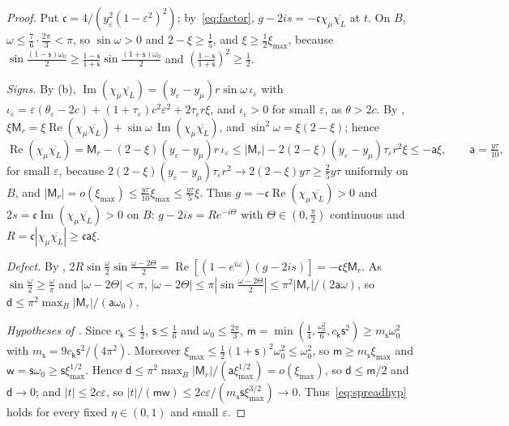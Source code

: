 \documentclass[11pt]{article}
\theoremstyle{definition}
\theoremstyle{remark}
\newcommand{\Rea}{\operatorname{Re}}
\newcommand{\Ima}{\operatorname{Im}}
\begin{document}
\begin{proof}
Put \(\mathfrak c=4/(y_\varepsilon^2(1-\varepsilon^2)^2)\); by~\eqref{eq:factor}, \(g-2is=-\mathfrak c\chi_\mu\overline{\chi_L}\) at \(t\).  On \(B\), \(\omega\le\frac76\cdot\frac{2\pi}3<\pi\), so
\(\sin\omega>0\) and \(2-\xi\ge\frac15\), and \(\xi\ge\frac12\xi_{\max}\), because \(\sin\frac{(1-\mathsf s)\omega_0}2\ge\frac{1-\mathsf s}{1+\mathsf s}\sin\frac{(1+\mathsf s)\omega_0}2\) and
\((\frac{1-\mathsf s}{1+\mathsf s})^2\ge\frac12\).

\emph{Signs.}  By (b), \(\Ima(\chi_\mu\overline{\chi_L})=(y_\varepsilon-y_\mu)r\sin\omega\,\iota_\varepsilon\) with
\(\iota_\varepsilon=\varepsilon(\theta_\varepsilon-2c)+(1+\tau_\varepsilon)c^2\varepsilon^2+2\tau_\varepsilon r\xi\), and \(\iota_\varepsilon>0\) for small \(\varepsilon\), as \(\theta>2c\).  By ,
\(\xi\mathsf M_r=\xi\Rea(\chi_\mu\overline{\chi_L})+\sin\omega\,\Ima(\chi_\mu\overline{\chi_L})\), and \(\sin^2\omega=\xi(2-\xi)\); hence
\[
\Rea(\chi_\mu\overline{\chi_L})=\mathsf M_r-(2-\xi)(y_\varepsilon-y_\mu)r\,\iota_\varepsilon\le|\mathsf M_r|-2(2-\xi)(y_\varepsilon-y_\mu)\tau_\varepsilon r^2\xi\le-\mathsf a\xi,\qquad \mathsf a=\tfrac{y\tau}{10},
\]
for small \(\varepsilon\), because \(2(2-\xi)(y_\varepsilon-y_\mu)\tau_\varepsilon r^2\to2(2-\xi)y\tau\ge\frac25y\tau\) uniformly on \(B\), and \(|\mathsf M_r|=o(\xi_{\max})\le\frac{y\tau}{10}\xi_{\max}\le\frac{y\tau}5\xi\).
Thus \(g=-\mathfrak c\Rea(\chi_\mu\overline{\chi_L})>0\) and \(2s=\mathfrak c\Ima(\chi_\mu\overline{\chi_L})>0\) on \(B\): \(g-2is=Re^{-i\Theta}\) with \(\Theta\in(0,\frac\pi2)\)
continuous and \(R=\mathfrak c|\chi_\mu\overline{\chi_L}|\ge\mathfrak c \mathsf a\xi\).

\emph{Defect.}  By , \(2R\sin\frac\omega2\sin\frac{\omega-2\Theta}2=\Rea[(1-e^{i\omega})(g-2is)]=-\mathfrak c\xi\mathsf M_r\).  As
\(\sin\frac\omega2\ge\frac\omega\pi\) and \(|\omega-2\Theta|<\pi\),
\(|\omega-2\Theta|\le\pi|\sin\frac{\omega-2\Theta}2|\le\pi^2|\mathsf M_r|/(2\mathsf a\omega)\), so \(\mathsf d\le\pi^2\max_B|\mathsf M_r|/(\mathsf a\omega_0)\).

\emph{Hypotheses of .}  Since \(c_{\mathsf k}\le\frac12\), \(\mathsf s\le\frac16\) and \(\omega_0\le\frac{2\pi}3\),
\(\mathsf m=\min(\frac14,\frac{\omega_0^2}6,c_{\mathsf k}\mathsf s^2)\ge m_{\mathsf s}\omega_0^2\) with \(m_{\mathsf s}=9c_{\mathsf k}\mathsf s^2/(4\pi^2)\).  Moreover
\(\xi_{\max}\le\frac12(1+\mathsf s)^2\omega_0^2\le\omega_0^2\), so \(\mathsf m\ge m_{\mathsf s}\xi_{\max}\) and \(\mathsf w=\mathsf s\omega_0\ge\mathsf s\xi_{\max}^{1/2}\).  Hence
\(\mathsf d\le\pi^2\max_B|\mathsf M_r|/(\mathsf a\xi_{\max}^{1/2})=o(\xi_{\max})\), so \(\mathsf d\le\mathsf m/2\) and \(\mathsf d\to0\); and \(|t|\le2c\varepsilon\), so
\(|t|/(\mathsf m\mathsf w)\le2c\varepsilon/(m_{\mathsf s}\mathsf s\xi_{\max}^{3/2})\to0\).  Thus~\eqref{eq:spreadhyp} holds for every fixed \(\eta\in(0,1)\) and small \(\varepsilon\).


\end{proof}
\end{document}
